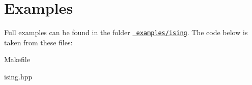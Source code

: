 \chapter{Examples}
\hypertarget{md_src_2examples}{}\label{md_src_2examples}
\label{md_src_2examples_autotoc_md0}%
%


Full examples can be found in the folder \href{../examples/ising/}{\texttt{ examples/ising}}. The code below is taken from these files\+:


\begin{DoxyItemize}
\item Makefile
\end{DoxyItemize}


\begin{DoxyCodeInclude}{0}
\DoxyCodeLine{}

\end{DoxyCodeInclude}



\begin{DoxyItemize}
\item ising.\+hpp
\end{DoxyItemize}


